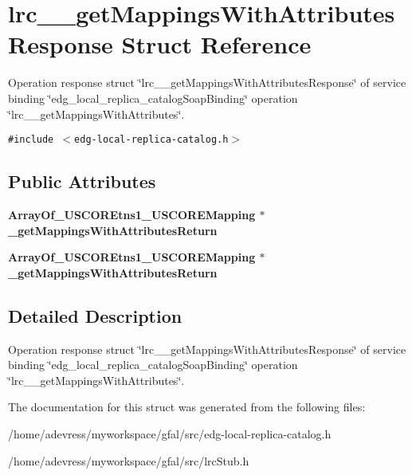 \section{lrc\_\-\_\-get\-Mappings\-With\-Attributes\-Response Struct Reference}
\label{structlrc____getMappingsWithAttributesResponse}
Operation response struct \char`\"{}lrc\_\-\_\-get\-Mappings\-With\-Attributes\-Response\char`\"{} of service binding \char`\"{}edg\_\-local\_\-replica\_\-catalog\-Soap\-Binding\char`\"{} operation \char`\"{}lrc\_\-\_\-get\-Mappings\-With\-Attributes\char`\"{}.  


{\tt \#include $<$edg-local-replica-catalog.h$>$}

\subsection*{Public Attributes}
\begin{CompactItemize}
\item 
\bf{Array\-Of\_\-USCOREtns1\_\-USCOREMapping} $\ast$ \textbf{\_\-get\-Mappings\-With\-Attributes\-Return}\label{structlrc____getMappingsWithAttributesResponse_111e34419f07a6afa141c3c6bbed7da2}

\item 
\bf{Array\-Of\_\-USCOREtns1\_\-USCOREMapping} $\ast$ \textbf{\_\-get\-Mappings\-With\-Attributes\-Return}\label{structlrc____getMappingsWithAttributesResponse_111e34419f07a6afa141c3c6bbed7da2}

\end{CompactItemize}


\subsection{Detailed Description}
Operation response struct \char`\"{}lrc\_\-\_\-get\-Mappings\-With\-Attributes\-Response\char`\"{} of service binding \char`\"{}edg\_\-local\_\-replica\_\-catalog\-Soap\-Binding\char`\"{} operation \char`\"{}lrc\_\-\_\-get\-Mappings\-With\-Attributes\char`\"{}. 



The documentation for this struct was generated from the following files:\begin{CompactItemize}
\item 
/home/adevress/myworkspace/gfal/src/edg-local-replica-catalog.h\item 
/home/adevress/myworkspace/gfal/src/lrc\-Stub.h\end{CompactItemize}
